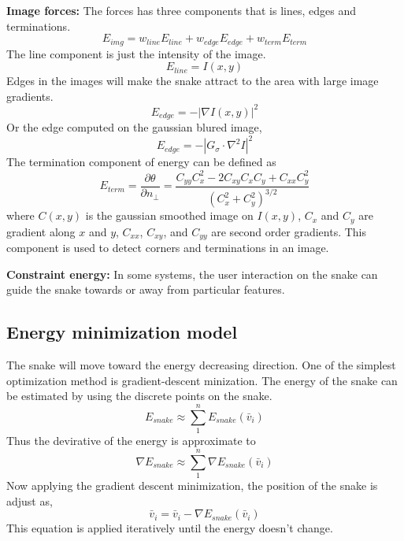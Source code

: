 \textbf{Image forces: } The forces has three components that is lines, edges and terminations.
\begin{equation}
E_{img} = w_{line}E_{line} + w_{edge}E_{edge} + w_{term}E_{term}
\end{equation}
The line component is just the intensity of the image.
\begin{equation}
E_{line} = I(x,y)
\end{equation}
Edges in the images will make the snake attract to the area with large image gradients.
\begin{equation}
E_{edge} = -|\nabla I(x,y)|^2
\end{equation}
Or the edge computed on the gaussian blured image,
\begin{equation}
E_{edge} = -|G_\sigma \cdot \nabla^2 I|^2
\end{equation}
The termination component of energy can be defined as
\begin{equation}
E_{term} = \frac{\partial \theta}{\partial n_\perp} = \frac{C_{yy}C_x^2 - 2C_{xy}C_xC_y + C_{xx}C_y^2}{(C_x^2 + C_y^2)^{3/2}}
\end{equation}
where $C(x,y)$ is the gaussian smoothed image on $I(x,y)$, $C_x$ and $C_y$ are gradient along $x$ and $y$, $C_{xx}$, $C_{xy}$, and $C_{yy}$ are second order gradients. This component is used to detect corners and terminations in an image.

\textbf{Constraint energy: } In some systems, the user interaction on the snake can guide the snake towards or away from particular features. 
\subsection{Energy minimization model}
The snake will move toward the energy decreasing direction. One of the simplest optimization method is gradient-descent minization\cite{snyman2005practical}. The energy of the snake can be estimated by using the discrete points on the snake. 
\begin{equation}
E_{snake} \approx \sum_1^nE_{snake}(\bar{v}_i)
\end{equation}
Thus the devirative of the energy is approximate to
\begin{equation}
\nabla E_{snake} \approx \sum_1^n \nabla E_{snake}(\bar{v}_i)
\end{equation}
Now applying the gradient descent minimization, the position of the snake is adjust as,
\begin{equation}
\bar{v}_i = \bar{v}_i - \nabla E_{snake}(\bar{v}_i)
\end{equation}
This equation is applied iteratively until the energy doesn't change.
